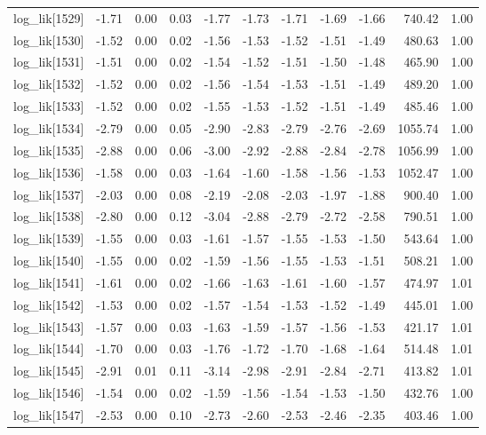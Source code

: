 \begin{table}[ht]
\begin{tabular}{rrrrrrrrrrr}
  log\_lik[1529] & -1.71 & 0.00 & 0.03 & -1.77 & -1.73 & -1.71 & -1.69 & -1.66 & 740.42 & 1.00 \\ 
  log\_lik[1530] & -1.52 & 0.00 & 0.02 & -1.56 & -1.53 & -1.52 & -1.51 & -1.49 & 480.63 & 1.00 \\ 
  log\_lik[1531] & -1.51 & 0.00 & 0.02 & -1.54 & -1.52 & -1.51 & -1.50 & -1.48 & 465.90 & 1.00 \\ 
  log\_lik[1532] & -1.52 & 0.00 & 0.02 & -1.56 & -1.54 & -1.53 & -1.51 & -1.49 & 489.20 & 1.00 \\ 
  log\_lik[1533] & -1.52 & 0.00 & 0.02 & -1.55 & -1.53 & -1.52 & -1.51 & -1.49 & 485.46 & 1.00 \\ 
  log\_lik[1534] & -2.79 & 0.00 & 0.05 & -2.90 & -2.83 & -2.79 & -2.76 & -2.69 & 1055.74 & 1.00 \\ 
  log\_lik[1535] & -2.88 & 0.00 & 0.06 & -3.00 & -2.92 & -2.88 & -2.84 & -2.78 & 1056.99 & 1.00 \\ 
  log\_lik[1536] & -1.58 & 0.00 & 0.03 & -1.64 & -1.60 & -1.58 & -1.56 & -1.53 & 1052.47 & 1.00 \\ 
  log\_lik[1537] & -2.03 & 0.00 & 0.08 & -2.19 & -2.08 & -2.03 & -1.97 & -1.88 & 900.40 & 1.00 \\ 
  log\_lik[1538] & -2.80 & 0.00 & 0.12 & -3.04 & -2.88 & -2.79 & -2.72 & -2.58 & 790.51 & 1.00 \\ 
  log\_lik[1539] & -1.55 & 0.00 & 0.03 & -1.61 & -1.57 & -1.55 & -1.53 & -1.50 & 543.64 & 1.00 \\ 
  log\_lik[1540] & -1.55 & 0.00 & 0.02 & -1.59 & -1.56 & -1.55 & -1.53 & -1.51 & 508.21 & 1.00 \\ 
  log\_lik[1541] & -1.61 & 0.00 & 0.02 & -1.66 & -1.63 & -1.61 & -1.60 & -1.57 & 474.97 & 1.01 \\ 
  log\_lik[1542] & -1.53 & 0.00 & 0.02 & -1.57 & -1.54 & -1.53 & -1.52 & -1.49 & 445.01 & 1.00 \\ 
  log\_lik[1543] & -1.57 & 0.00 & 0.03 & -1.63 & -1.59 & -1.57 & -1.56 & -1.53 & 421.17 & 1.01 \\ 
  log\_lik[1544] & -1.70 & 0.00 & 0.03 & -1.76 & -1.72 & -1.70 & -1.68 & -1.64 & 514.48 & 1.01 \\ 
  log\_lik[1545] & -2.91 & 0.01 & 0.11 & -3.14 & -2.98 & -2.91 & -2.84 & -2.71 & 413.82 & 1.01 \\ 
  log\_lik[1546] & -1.54 & 0.00 & 0.02 & -1.59 & -1.56 & -1.54 & -1.53 & -1.50 & 432.76 & 1.00 \\ 
  log\_lik[1547] & -2.53 & 0.00 & 0.10 & -2.73 & -2.60 & -2.53 & -2.46 & -2.35 & 403.46 & 1.00 \\ 

\end{tabular}
\end{table}
